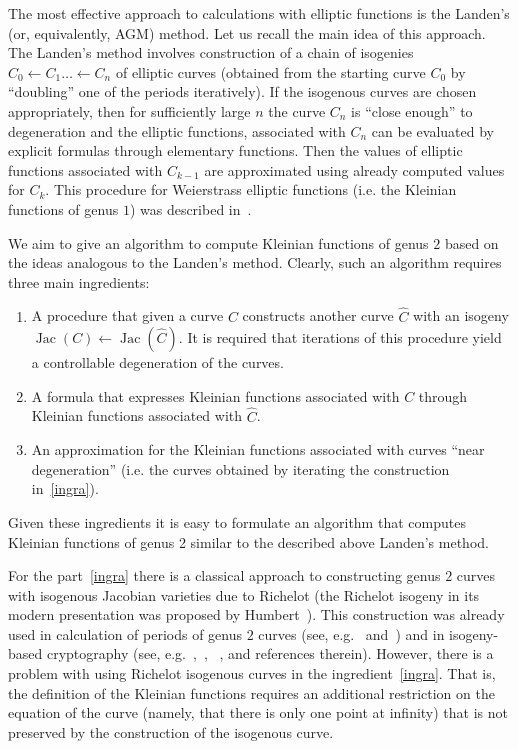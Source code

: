 \documentclass{amsart}
\numberwithin{equation}{section}
\theoremstyle{definition}
\theoremstyle{remark}
\DeclareMathOperator{\Jac}{Jac}
\begin{document}
	The most effective approach to calculations with elliptic functions is the Landen's (or, equivalently, AGM) method. Let us recall the main idea of this approach. The Landen's method involves construction of a chain of isogenies $C_0 \leftarrow C_1 \dots \leftarrow C_n$ of elliptic curves (obtained from the starting curve $C_0$ by ``doubling'' one of the periods iteratively). If the isogenous curves are chosen appropriately, then for sufficiently large $n$ the curve $C_n$ is ``close enough'' to degeneration and the elliptic functions, associated with $C_n$ can be evaluated by explicit formulas through elementary functions. Then the values of elliptic functions associated with $C_{k-1}$ are approximated using already computed values for $C_k$. This procedure for Weierstrass elliptic functions (i.e. the Kleinian functions of genus $1$) was described in~\cite{Smirnov}.
	
	We aim to give an algorithm to compute Kleinian functions of genus $2$ based on the ideas analogous to the Landen's method. Clearly, such an algorithm requires three main ingredients:
	\begin{enumerate}[label=(\alph*)]
		\item\label{ingra} A procedure that given a curve $C$ constructs another curve $\hat C$ with an isogeny $\Jac(C) \leftarrow \Jac(\hat C)$. It is required that iterations of this procedure yield a controllable degeneration of the curves.
		\item\label{ingrb} A formula that expresses Kleinian functions associated with $C$ through Kleinian functions associated with $\hat C$.
		\item\label{ingrc} An approximation for the Kleinian functions associated with curves ``near degeneration'' (i.e. the curves obtained by iterating the construction in~\ref{ingra}).
	\end{enumerate}
	Given these ingredients it is easy to formulate an algorithm that computes Kleinian functions of genus 2 similar to the described above Landen's method.
	
	For the part~\ref{ingra} there is a classical approach to constructing genus $2$ curves with isogenous Jacobian varieties due to Richelot (the Richelot isogeny in its modern presentation was proposed by Humbert~\cite{Humbert}). This construction was already used in calculation of periods of genus $2$ curves (see, e.g.~\cite{BostMestre} and~\cite{Chow}) and in isogeny-based cryptography (see, e.g.~\cite{CasselsFlynn},~\cite{flynnPaper}, ~\cite{takashima}, and references therein).   However, there is a problem with using Richelot isogenous curves in the ingredient~\ref{ingra}. That is, the definition of the Kleinian functions requires an additional restriction on the equation of the curve (namely, that there is only one point at infinity) that is not preserved by the construction of the isogenous curve. 
	
\end{document}

